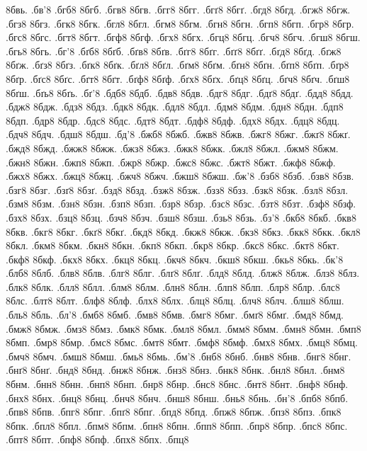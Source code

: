 {8бвь.
.бв'8
.бгб8
8бгб.
.бгв8
8бгв.
.бгг8
8бгг.
.бгґ8
8бгґ.
.бгд8
8бгд.
.бгж8
8бгж.
.бгз8
8бгз.
.бгк8
8бгк.
.бгл8
8бгл.
.бгм8
8бгм.
.бгн8
8бгн.
.бгп8
8бгп.
.бгр8
8бгр.
.бгс8
8бгс.
.бгт8
8бгт.
.бгф8
8бгф.
.бгх8
8бгх.
.бгц8
8бгц.
.бгч8
8бгч.
.бгш8
8бгш.
.бгь8
8бгь.
.бг'8
.бґб8
8бґб.
.бґв8
8бґв.
.бґг8
8бґг.
.бґґ8
8бґґ.
.бґд8
8бґд.
.бґж8
8бґж.
.бґз8
8бґз.
.бґк8
8бґк.
.бґл8
8бґл.
.бґм8
8бґм.
.бґн8
8бґн.
.бґп8
8бґп.
.бґр8
8бґр.
.бґс8
8бґс.
.бґт8
8бґт.
.бґф8
8бґф.
.бґх8
8бґх.
.бґц8
8бґц.
.бґч8
8бґч.
.бґш8
8бґш.
.бґь8
8бґь.
.бґ'8
.бдб8
8бдб.
.бдв8
8бдв.
.бдг8
8бдг.
.бдґ8
8бдґ.
.бдд8
8бдд.
.бдж8
8бдж.
.бдз8
8бдз.
.бдк8
8бдк.
.бдл8
8бдл.
.бдм8
8бдм.
.бдн8
8бдн.
.бдп8
8бдп.
.бдр8
8бдр.
.бдс8
8бдс.
.бдт8
8бдт.
.бдф8
8бдф.
.бдх8
8бдх.
.бдц8
8бдц.
.бдч8
8бдч.
.бдш8
8бдш.
.бд'8
.бжб8
8бжб.
.бжв8
8бжв.
.бжг8
8бжг.
.бжґ8
8бжґ.
.бжд8
8бжд.
.бжж8
8бжж.
.бжз8
8бжз.
.бжк8
8бжк.
.бжл8
8бжл.
.бжм8
8бжм.
.бжн8
8бжн.
.бжп8
8бжп.
.бжр8
8бжр.
.бжс8
8бжс.
.бжт8
8бжт.
.бжф8
8бжф.
.бжх8
8бжх.
.бжц8
8бжц.
.бжч8
8бжч.
.бжш8
8бжш.
.бж'8
.бзб8
8бзб.
.бзв8
8бзв.
.бзг8
8бзг.
.бзґ8
8бзґ.
.бзд8
8бзд.
.бзж8
8бзж.
.бзз8
8бзз.
.бзк8
8бзк.
.бзл8
8бзл.
.бзм8
8бзм.
.бзн8
8бзн.
.бзп8
8бзп.
.бзр8
8бзр.
.бзс8
8бзс.
.бзт8
8бзт.
.бзф8
8бзф.
.бзх8
8бзх.
.бзц8
8бзц.
.бзч8
8бзч.
.бзш8
8бзш.
.бзь8
8бзь.
.бз'8
.бкб8
8бкб.
.бкв8
8бкв.
.бкг8
8бкг.
.бкґ8
8бкґ.
.бкд8
8бкд.
.бкж8
8бкж.
.бкз8
8бкз.
.бкк8
8бкк.
.бкл8
8бкл.
.бкм8
8бкм.
.бкн8
8бкн.
.бкп8
8бкп.
.бкр8
8бкр.
.бкс8
8бкс.
.бкт8
8бкт.
.бкф8
8бкф.
.бкх8
8бкх.
.бкц8
8бкц.
.бкч8
8бкч.
.бкш8
8бкш.
.бкь8
8бкь.
.бк'8
.блб8
8блб.
.блв8
8блв.
.блг8
8блг.
.блґ8
8блґ.
.блд8
8блд.
.блж8
8блж.
.блз8
8блз.
.блк8
8блк.
.блл8
8блл.
.блм8
8блм.
.блн8
8блн.
.блп8
8блп.
.блр8
8блр.
.блс8
8блс.
.блт8
8блт.
.блф8
8блф.
.блх8
8блх.
.блц8
8блц.
.блч8
8блч.
.блш8
8блш.
.бль8
8бль.
.бл'8
.бмб8
8бмб.
.бмв8
8бмв.
.бмг8
8бмг.
.бмґ8
8бмґ.
.бмд8
8бмд.
.бмж8
8бмж.
.бмз8
8бмз.
.бмк8
8бмк.
.бмл8
8бмл.
.бмм8
8бмм.
.бмн8
8бмн.
.бмп8
8бмп.
.бмр8
8бмр.
.бмс8
8бмс.
.бмт8
8бмт.
.бмф8
8бмф.
.бмх8
8бмх.
.бмц8
8бмц.
.бмч8
8бмч.
.бмш8
8бмш.
.бмь8
8бмь.
.бм'8
.бнб8
8бнб.
.бнв8
8бнв.
.бнг8
8бнг.
.бнґ8
8бнґ.
.бнд8
8бнд.
.бнж8
8бнж.
.бнз8
8бнз.
.бнк8
8бнк.
.бнл8
8бнл.
.бнм8
8бнм.
.бнн8
8бнн.
.бнп8
8бнп.
.бнр8
8бнр.
.бнс8
8бнс.
.бнт8
8бнт.
.бнф8
8бнф.
.бнх8
8бнх.
.бнц8
8бнц.
.бнч8
8бнч.
.бнш8
8бнш.
.бнь8
8бнь.
.бн'8
.бпб8
8бпб.
.бпв8
8бпв.
.бпг8
8бпг.
.бпґ8
8бпґ.
.бпд8
8бпд.
.бпж8
8бпж.
.бпз8
8бпз.
.бпк8
8бпк.
.бпл8
8бпл.
.бпм8
8бпм.
.бпн8
8бпн.
.бпп8
8бпп.
.бпр8
8бпр.
.бпс8
8бпс.
.бпт8
8бпт.
.бпф8
8бпф.
.бпх8
8бпх.
.бпц8
}
